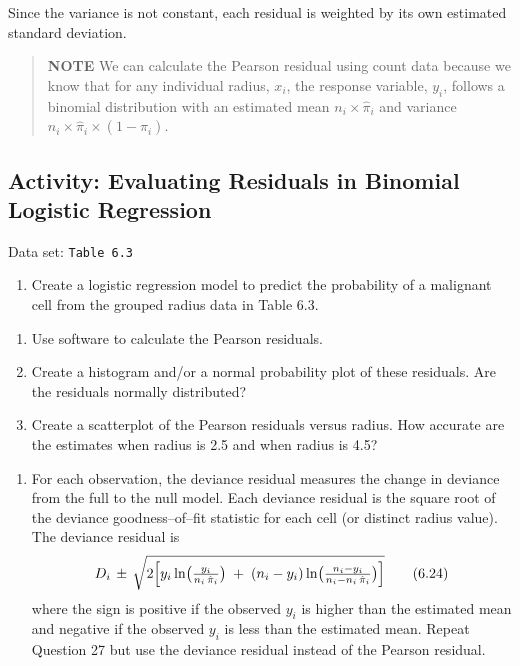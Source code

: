 \documentclass[
]{book}
\providecommand{\tightlist}{%
  \setlength{\itemsep}{0pt}\setlength{\parskip}{0pt}}
\begin{document}
Since the variance is not constant, each residual is weighted by its own estimated standard deviation.

\begin{quote}
\textbf{NOTE} We can calculate the Pearson residual using count data because we know that for any individual radius, \(x_i\), the response variable, \(y_i\), follows a binomial distribution with an estimated mean \(n_i \times \hat\pi_i\) and variance \(n_i \times \hat\pi_i \times (1 - \hat\pi_i)\).
\end{quote}

\hypertarget{activity-evaluating-residuals-in-binomial-logistic-regression}{%
\subsection*{Activity: Evaluating Residuals in Binomial Logistic Regression}\label{activity-evaluating-residuals-in-binomial-logistic-regression}}

Data set: \texttt{Table\ 6.3}

\begin{enumerate}
\def\labelenumi{\arabic{enumi}.}
\setcounter{enumi}{26}
\tightlist
\item
  Create a logistic regression model to predict the probability of a malignant cell from the grouped radius data in Table 6.3.
\end{enumerate}

\begin{enumerate}
\def\labelenumi{\alph{enumi}.}
\tightlist
\item
  Use software to calculate the Pearson residuals.\\
\item
  Create a histogram and/or a normal probability plot of these residuals. Are the residuals normally distributed?\\
\item
  Create a scatterplot of the Pearson residuals versus radius. How accurate are the estimates when radius is 2.5 and when radius is 4.5?
\end{enumerate}

\begin{enumerate}
\def\labelenumi{\arabic{enumi}.}
\setcounter{enumi}{27}
\tightlist
\item
  For each observation, the deviance residual measures the change in deviance from the full to the null model. Each deviance residual is the square root of the deviance goodness--of--fit statistic for each cell (or distinct radius value). The deviance residual is
  \begin{align}
  D_i \,\pm\, \sqrt{2 \Bigl[
  y_i \ln\bigl(\tfrac{y_i}{n_i\,\hat\pi_i}\bigr)
  \;+\;(n_i - y_i)\ln\bigl(\tfrac{n_i - y_i}{n_i - n_i\,\hat\pi_i}\bigr)
  \Bigr]}
  \tag{6.24}
  \end{align}
  where the sign is positive if the observed \(y_i\) is higher than the estimated mean and negative if the observed \(y_i\) is less than the estimated mean. Repeat Question 27 but use the deviance residual instead of the Pearson residual.
\end{enumerate}
\end{document}
